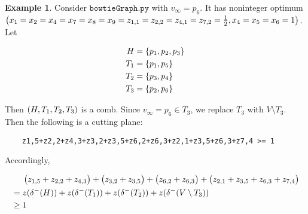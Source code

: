 \documentclass{memoir}
\theoremstyle{plain}
\theoremstyle{definition}
\newtheorem{example}{Example}
\begin{document}
\begin{example}
	Consider $\texttt{bowtieGraph.py}$ with $v_\infty = p_6$. 
	It has noninteger optimum $\del{x_1=x_2=x_4=x_7=x_8=x_9=z_{1,1}=z_{2,2}=z_{4,1}=z_{7,2} = \frac{1}{2}, x_4=x_5=x_6 = 1}$.
	Let

	\begin{align*}
		H &= \cbr{p_1, p_2, p_3} \\
		T_1 &= \cbr{p_1, p_5} \\
		T_2 &= \cbr{p_3, p_4} \\
		T_3 &= \cbr{p_2, p_6}
	\end{align*}

	Then $\del{H,T_1,T_2,T_3}$ is a comb. Since $v_\infty = p_6 \in T_3$, we replace
	$T_3$ with $V\setminus T_3$. Then the following is a cutting plane:

	\begin{verbatim}
	z1,5+z2,2+z4,3+z3,2+z3,5+z6,2+z6,3+z2,1+z3,5+z6,3+z7,4 >= 1
	\end{verbatim}

	Accordingly,

	\begin{align*}
		&\phantom{{}={}} \del{z_{1,5}+z_{2,2}+z_{4,3}}+\del{z_{3,2}+z_{3,5}}+\del{z_{6,2}+z_{6,3}}+\del{z_{2,1}+z_{3,5}+z_{6,3}+z_{7,4}} \\ 
		&= z(\delta^-(H)) + z(\delta^-(T_1)) + z(\delta^-(T_2)) + z(\delta^-(V\setminus T_3)) \\
		&\geq 1
	\end{align*}

\end{example}
\end{document}

